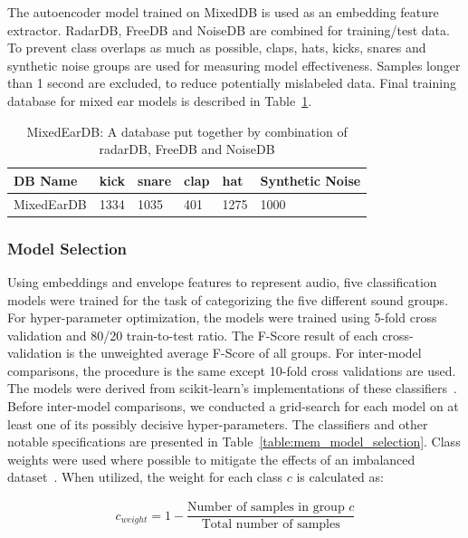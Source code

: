 \documentclass[\main/thesis.tex]{subfiles}
\begin{document}
The autoencoder model trained on MixedDB is used as an embedding feature extractor. RadarDB, FreeDB and NoiseDB are combined for training/test data. To prevent class overlaps as much as possible, claps, hats, kicks, snares and synthetic noise groups are used for measuring model effectiveness. Samples longer than 1 second are excluded, to reduce potentially mislabeled data. Final training database for mixed ear models is described in Table~\ref{db:memDB}.
\begin{table}[htbp]
\centering
\begin{tabular}{|l|l|l|l|l|l|}
\hline
 DB Name & kick & snare & clap & hat & Synthetic Noise\\\hline
 MixedEarDB & 1334 & 1035 & 401 & 1275 & 1000 \\ \hline
\end{tabular}
\caption{MixedEarDB: A database put together by combination of radarDB, FreeDB and NoiseDB}
\label{db:memDB}
\end{table}

\subsubsection{Model Selection}
Using embeddings and envelope features to represent audio, five classification models were trained for the task of categorizing the five different sound groups. For hyper-parameter optimization, the models were trained using 5-fold cross validation and 80/20 train-to-test ratio. The F-Score result of each cross-validation is the unweighted average F-Score of all groups. For inter-model comparisons, the procedure is the same except 10-fold cross validations are used. The models were derived from scikit-learn's implementations of these classifiers~\cite{pedregosa2011scikit}. Before inter-model comparisons, we conducted a grid-search for each model on at least one of its possibly decisive hyper-parameters. The classifiers and other notable specifications are presented in Table~\ref{table:mem_model_selection}. Class weights were used where possible to mitigate the effects of an imbalanced dataset~\cite{provost2000machine,chawla2004special}. When utilized, the weight for each class $c$ is calculated as:

\begin{subequations}
    \begin{align*}
    c_{weight} = 1-\dfrac{\text{Number of samples in group $c$} }{\text{Total number of samples}}
    \end{align*}
\end{subequations}
\end{document}
